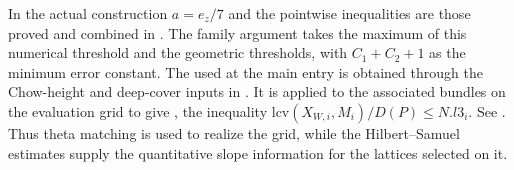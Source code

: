 In the actual construction \(a=e_z/7\) and the pointwise inequalities are those proved and combined in . The family argument takes the maximum of this numerical threshold and the geometric thresholds, with \(C_1+C_2+1\) as the minimum error constant. The  used at the main entry is obtained through the Chow-height and deep-cover inputs in . It is applied to the associated bundles on the evaluation grid to give , the inequality \(\mathrm{lcv}(X_{W,i},M_i)/D(P)\le N.l3_i\). See . Thus theta matching is used to realize the grid, while the Hilbert--Samuel estimates supply the quantitative slope information for the lattices selected on it.
